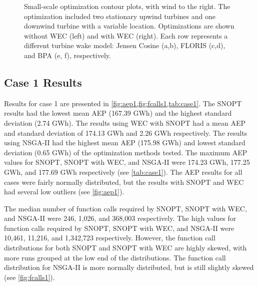 \documentclass[a4paper]{jpconf}
\begin{document}
\begin{figure}[H]
{    }
    \caption{Small-scale optimization contour plots, with wind to the right. The optimization included two stationary upwind turbines and one downwind turbine with a variable location. Optimizations are shown without WEC (left) and with WEC (right). Each row represents a different turbine wake model: Jensen Cosine (a,b), FLORIS (c,d), and BPA (e, f), respectively.}
    \label{fig:SmallScaleOptimizations}
\end{figure}


\subsection{Case 1 Results}
Results for case 1 are presented in \cref{fig:aep1,fig:fcalls1,tab:case1}. The SNOPT results had the lowest mean AEP (167.39 GWh) and the highest standard deviation (2.74 GWh). The results using WEC with SNOPT had a mean AEP and standard deviation of 174.13 GWh and 2.26 GWh respectively. The results using NSGA-II had the highest mean AEP (175.98 GWh) and lowest standard deviation (0.65 GWh) of the optimization methods tested. The maximum AEP values for SNOPT, SNOPT with WEC, and NSGA-II were 174.23 GWh, 177.25 GWh, and 177.69 GWh respectively (see \cref{tab:case1}). The AEP results for all cases were fairly normally distributed, but the results with SNOPT and WEC had several low outliers (see \cref{fig:aep1}).

 The median number of function calls required by SNOPT, SNOPT with WEC, and NSGA-II were 246, 1,026, and 368,003 respectively. The high values for function calls required by SNOPT, SNOPT with WEC, and NSGA-II were 10,461, 11,216, and 1,342,723 respectively. However, the function call distributions for both SNOPT and SNOPT with WEC are highly skewed, with more runs grouped at the low end of the distributions. The function call distribution for NSGA-II is more normally distributed, but is still slightly skewed (see \cref{fig:fcalls1}).
\end{document}
